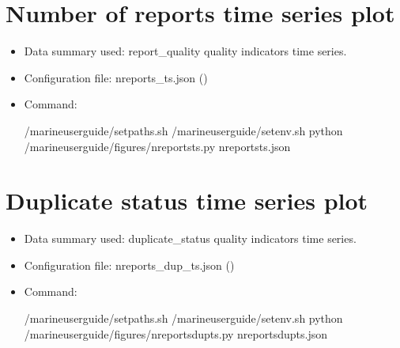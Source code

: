 \documentclass[letterpaper,10pt,english]{sphinxmanual}
\begin{document}
\section{Number of reports time series plot}
\label{\detokenize{index:number-of-reports-time-series-plot}}\begin{itemize}
\item {} 
Data summary used: report\_quality quality indicators time series.

\item {} 
Configuration file: nreports\_ts.json ({\hyperref[\detokenize{index:nreports-ts-config}]{}})

\item {} 
Command:

\begin{sphinxVerbatim}[commandchars=\\\{\}]
 /marine\PYGZhy{}user\PYGZhy{}guide/setpaths.sh
 /marine\PYGZhy{}user\PYGZhy{}guide/setenv.sh
python /marine\PYGZhy{}user\PYGZhy{}guide/figures/nreports\PYGZus{}ts.py nreports\PYGZus{}ts.json
\end{sphinxVerbatim}

\end{itemize}


\section{Duplicate status time series plot}
\label{\detokenize{index:duplicate-status-time-series-plot}}\begin{itemize}
\item {} 
Data summary used: duplicate\_status quality indicators time series.

\item {} 
Configuration file: nreports\_dup\_ts.json ({\hyperref[\detokenize{index:nreports-dup-ts-config}]{}})

\item {} 
Command:

\begin{sphinxVerbatim}[commandchars=\\\{\}]
 /marine\PYGZhy{}user\PYGZhy{}guide/setpaths.sh
 /marine\PYGZhy{}user\PYGZhy{}guide/setenv.sh
python /marine\PYGZhy{}user\PYGZhy{}guide/figures/nreports\PYGZus{}dup\PYGZus{}ts.py nreports\PYGZus{}dup\PYGZus{}ts.json
\end{sphinxVerbatim}

\end{itemize}
\end{document}
